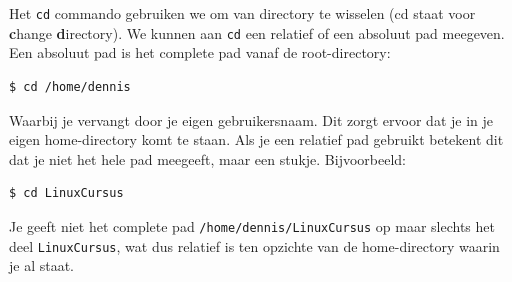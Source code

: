 Het \texttt{cd} commando gebruiken we om van directory te wisselen (cd staat voor \textbf{c}hange \textbf{d}irectory). We kunnen aan \texttt{cd} een relatief of een absoluut pad meegeven. Een absoluut pad is het complete pad vanaf de root-directory:
\begin{lstlisting}[language=bash]
$ cd /home/dennis
\end{lstlisting}
Waarbij je  vervangt door je eigen gebruikersnaam. Dit zorgt ervoor dat je in je eigen home-directory komt te staan. Als je een relatief pad gebruikt betekent dit dat je niet het hele pad meegeeft, maar een stukje. Bijvoorbeeld:
\begin{lstlisting}[language=bash]
$ cd LinuxCursus
\end{lstlisting}
Je geeft niet het complete pad \texttt{/home/dennis/LinuxCursus} op maar slechts het deel \texttt{LinuxCursus}, wat dus relatief is ten opzichte van de home-directory waarin je al staat.



